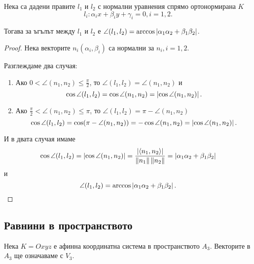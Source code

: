\documentclass[numbers=endperiod, DIV=15]{scrartcl}
\begin{document}
\begin{theorem}
  Нека са дадени правите $l_1$ и $l_2$ с нормални уравнения спрямо ортонормирана $K$
  \begin{displaymath}
    l_i: \alpha_i x + \beta_i y + \gamma_i = 0, i = 1, 2.
  \end{displaymath}

  Тогава за ъгълът между $l_1$ и $l_2$ е $\angle(l_1, l_2) = \arccos \left\vert \alpha_1 \alpha_2 + \beta_1 \beta_2 \right\vert$.
\end{theorem}
\begin{proof}
  Нека векторите $n_i(\alpha_i, \beta_i)$ са нормални за $n_i, i = 1, 2$.

  Разглеждаме два случая:
  \begin{enumerate}
    \item Ако $0 < \angle(n_1, n_2) \leq \frac {\pi} 2$, то $\angle(l_1, l_2) = \angle(n_1, n_2)$ и
    \begin{displaymath}
      \cos \angle (l_1, l_2)
      =
      \cos \angle(n_1, n_2)
      =
      \left\vert \cos \angle (n_1, n_2) \right\vert.
    \end{displaymath}

    \item Ако $\frac {\pi} 2 < \angle(n_1, n_2) \leq \pi$, то $\angle(l_1, l_2) = \pi - \angle(n_1, n_2)$
    \begin{displaymath}
      \cos \angle (l_1, l_2)
      =
      \cos (\pi - \angle(n_1, n_2))
      =
      -\cos \angle(n_1, n_2)
      =
      \left\vert \cos \angle (n_1, n_2) \right\vert.
    \end{displaymath}
  \end{enumerate}

  И в двата случая имаме
  \begin{displaymath}
    \cos \angle(l_1, l_2)
    =
    \left\vert \cos \angle(n_1, n_2) \right\vert
    =
    \frac {\left\vert \left\langle n_1, n_2 \right\rangle \right\vert} {\left\Vert n_1 \right\Vert \left\Vert n_2 \right\Vert}
    =
    \left\vert \alpha_1 \alpha_2 + \beta_1 \beta_2 \right\vert
  \end{displaymath}
  и
  \begin{displaymath}
    \angle(l_1, l_2)
    =
    \arccos \left\vert \alpha_1 \alpha_2 + \beta_1 \beta_2 \right\vert.
  \end{displaymath}
\end{proof}

\subsection{Равнини в пространството}

Нека $K = Oxyz$ е афинна координатна система в пространството $A_3$. Векторите в $A_3$ ще означаваме с $V_3$.
\end{document}
